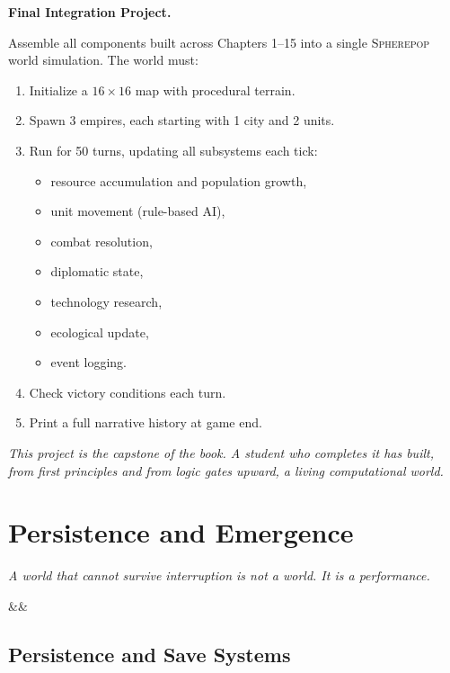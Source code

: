 \documentclass[11pt,a4paper,openany]{book}
\theoremstyle{plain}
\theoremstyle{definition}
\theoremstyle{remark}
\newenvironment{project}[1]{%
  \begin{tcolorbox}[
    title={\textbf{Project: #1}},
    colback=projectbg,
    colframe=sphereblue,
    fonttitle=\bfseries\color{white},
    coltitle=white,
    attach boxed title to top left={yshift=-2mm, xshift=4mm},
    boxed title style={colback=sphereblue, sharp corners},
    sharp corners,
    breakable,
    before upper={\normalfont\setlength{\parindent}{0pt}\tolerance=9999\hbadness=9999}
  ]
}{\end{tcolorbox}}
\newcommand{\Sp}{\textsc{Spherepop}\xspace}
\newcommand{\chapterquote}[2]{%
  \par\vspace{0.8em}%
  \begin{flushright}%
    \begin{minipage}{0.65\textwidth}%
      {\itshape #1\par}%
      \ifx&#2&\else\vspace{0.3em}{\raggedleft\small--- #2\par}\fi%
    \end{minipage}%
  \end{flushright}%
  \vspace{0.8em}\par\noindent}
\begin{document}
\begin{project}{The Complete World}
  \textbf{Final Integration Project.}

  Assemble all components built across Chapters 1--15 into a single
  \Sp{} world simulation. The world must:

  \begin{enumerate}
    \item Initialize a $16 \times 16$ map with procedural terrain.
    \item Spawn 3 empires, each starting with 1 city and 2 units.
    \item Run for 50 turns, updating all subsystems each tick:
      \begin{itemize}
        \item resource accumulation and population growth,
        \item unit movement (rule-based AI),
        \item combat resolution,
        \item diplomatic state,
        \item technology research,
        \item ecological update,
        \item event logging.
      \end{itemize}
    \item Check victory conditions each turn.
    \item Print a full narrative history at game end.
  \end{enumerate}

  \medskip
  \noindent\textit{This project is the capstone of the book.
  A student who completes it has built, from first principles
  and from logic gates upward, a living computational world.}
\end{project}



\part{Persistence and Emergence}

\chapterquote{A world that cannot survive interruption is not a world.
  It is a performance.
}{}

\chapter{Persistence and Save Systems}
\label{ch:persistence}
\end{document}
